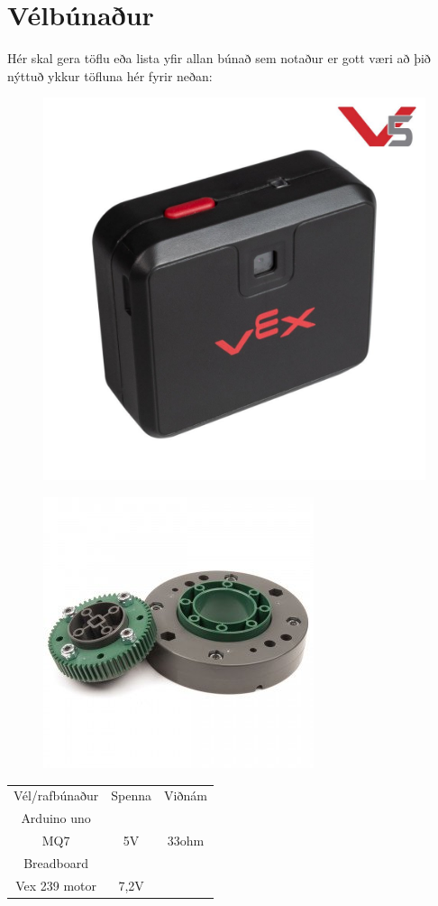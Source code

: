 \section{Vélbúnaður}
Hér skal gera töflu eða lista yfir allan búnað sem notaður er gott væri að þið nýttuð ykkur töfluna hér fyrir neðan:
\begin{figure}[h]
\centering
\includegraphics[scale=.2]{img/visionsensor}
\end{figure}
\begin{figure}[h]
\centering
\includegraphics[scale=.6]{img/275-1810-turntable-bearing-together}
\end{figure}
\begin{center}
\begin{tabular}{ |c|c|c| } 
 \hline
 Vél/rafbúnaður &Spenna &Viðnám\\ 
 Arduino uno & &\\ 
 MQ7 &5V & 33ohm \\ 
 Breadboard & & \\
 Vex 239 motor & 7,2V & \\
 \hline
\end{tabular}
\end{center}